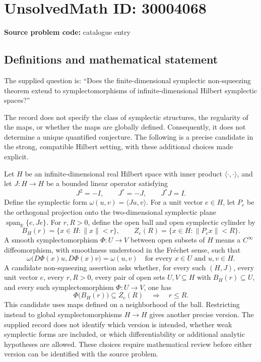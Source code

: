 \documentclass[11pt]{article}
\newcommand{\R}{\mathbb{R}}
\begin{document}
\section*{UnsolvedMath ID: 30004068}
\textbf{Source problem code:} catalogue entry
\subsection{Definitions and mathematical statement}
The supplied question is: ``Does the finite-dimensional symplectic non-squeezing theorem extend to symplectomorphisms of infinite-dimensional Hilbert symplectic spaces?''

The record does not specify the class of symplectic structures, the regularity of the maps, or whether the maps are globally defined. Consequently, it does not determine a unique quantified conjecture. The following is a precise candidate in the strong, compatible Hilbert setting, with these additional choices made explicit.

Let \(H\) be an infinite-dimensional real Hilbert space with inner product \(\langle\cdot,\cdot\rangle\), and let \(J:H\to H\) be a bounded linear operator satisfying
\[
J^2=-I,\qquad J^*=-J,\qquad J^*J=I.
\]
Define the symplectic form \(\omega(u,v)=\langle Ju,v\rangle\). For a unit vector \(e\in H\), let \(P_e\) be the orthogonal projection onto the two-dimensional symplectic plane \(\operatorname{span}_{\R}\{e,Je\}\). For \(r,R>0\), define the open ball and open symplectic cylinder by
\[
B_H(r)=\{x\in H:\|x\|<r\},\qquad
Z_e(R)=\{x\in H:\|P_ex\|<R\}.
\]
A smooth symplectomorphism \(\Phi:U\to V\) between open subsets of \(H\) means a \(C^\infty\) diffeomorphism, with smoothness understood in the Fr\'echet sense, such that
\[
\omega\bigl(D\Phi(x)u,D\Phi(x)v\bigr)=\omega(u,v)
\quad\text{for every }x\in U\text{ and }u,v\in H.
\]
A candidate non-squeezing assertion asks whether, for every such \((H,J)\), every unit vector \(e\), every \(r,R>0\), every pair of open sets \(U,V\subseteq H\) with \(B_H(r)\subseteq U\), and every such symplectomorphism \(\Phi:U\to V\), one has
\[
\Phi\bigl(B_H(r)\bigr)\subseteq Z_e(R)
\quad\Longrightarrow\quad r\le R.
\]
This candidate uses maps defined on a neighborhood of the ball. Restricting instead to global symplectomorphisms \(H\to H\) gives another precise version. The supplied record does not identify which version is intended, whether weak symplectic forms are included, or which differentiability or additional analytic hypotheses are allowed. These choices require mathematical review before either version can be identified with the source problem.
\end{document}
